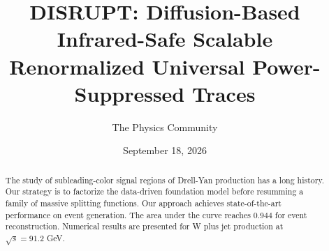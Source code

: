 \documentclass[11pt]{article}
\title{DISRUPT: Diffusion-Based Infrared-Safe Scalable Renormalized Universal Power-Suppressed Traces}
\author{The Physics Community}
\date{September 18, 2026}
\numberwithin{equation}{section}
\theoremstyle{definition}
\theoremstyle{remark}
\begin{document}
\maketitle
\begin{abstract}
The study of subleading-color signal regions of Drell-Yan production has
a long history. Our strategy is to factorize the data-driven foundation
model before resumming a family of massive splitting functions. Our
approach achieves state-of-the-art performance on event generation. The
area under the curve reaches 0.944 for event reconstruction. Numerical
results are presented for W plus jet production at $\sqrt{s} = 91.2$
GeV.
\end{abstract}
\tableofcontents




\nocite{*}


\end{document}
